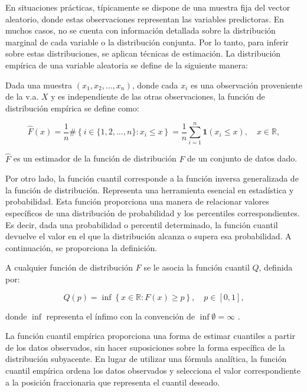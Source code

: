 En situaciones prácticas, típicamente se dispone de una muestra fija del vector aleatorio, donde estas observaciones representan las variables predictoras. En muchos casos, no se cuenta con información detallada sobre la distribución marginal de cada variable o la distribución conjunta. Por lo tanto, para inferir sobre estas distribuciones, se aplican técnicas de estimación. La distribución empírica de una variable aleatoria se define de la siguiente manera:

\begin{defn}
 Dada una muestra $(x_1, x_2, \dots, x_n)$, donde cada $x_i$ es una observación proveniente de la v.a. $X$ y es independiente de las otras observaciones, la función de distribución empírica se define como:

\begin{equation}\label{fdaEmp}
    \widehat{F}(x)=\frac{1}{n} \#\left\{i \in\{1,2, \ldots, n\}: x_i \leq x\right\}=\frac{1}{n} \sum_{i=1}^n \mathbf{1}\left(x_i \leq x\right), \quad x \in \mathbb{R},
\end{equation}    
\end{defn}

$\widehat{F}$ es un estimador de la función de distribución $F$ de un conjunto de datos dado.

Por otro lado, la función cuantil corresponde a la función inversa generalizada de la función de distribución. Representa una herramienta esencial en estadística y probabilidad. Esta función proporciona una manera de relacionar valores específicos de una distribución de probabilidad y los percentiles correspondientes. Es decir, dada una probabilidad o percentil determinado, la función cuantil devuelve el valor en el que la distribución alcanza o supera esa probabilidad. A continuación, se proporciona la definición.

\begin{defn}\label{defcuantil}
    A cualquier función de distribución $F$ se le asocia la función cuantil $Q$, definida por:
    
    \begin{equation}\label{eqdefcuantil}
        Q(p) = \inf \left\{ x \in \mathbb{R}: F(x) \geq p \right\}, \quad p \in [0, 1],
    \end{equation}
    
    donde $\inf$ representa el ínfimo con la convención de $\inf \emptyset = \infty$ \cite{CopulasR}.
    \end{defn}

La función cuantil empírica proporciona una forma de estimar cuantiles a partir de los datos observados, sin hacer suposiciones sobre la forma específica de la distribución subyacente. En lugar de utilizar una fórmula analítica, la función cuantil empírica ordena los datos observados y selecciona el valor correspondiente a la posición fraccionaria que representa el cuantil deseado.


